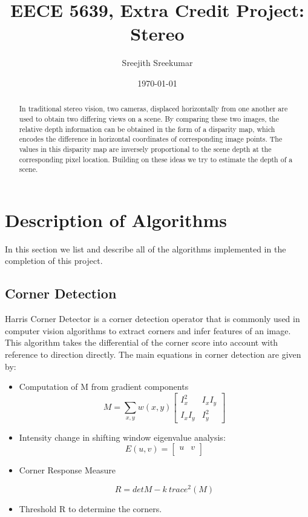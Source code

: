 \documentclass[letterpaper,11pt]{article}
\title{\textbf{EECE 5639, Extra Credit Project:
\\{\Large Stereo}}}
\author{Sreejith Sreekumar}
\date{\today}
\begin{document}
\maketitle

\begin{abstract}
  In traditional stereo vision, two cameras, displaced horizontally from one another are used to obtain two differing views on a scene. By comparing these two images, the relative depth information can be obtained in the form of a disparity map, which encodes the difference in horizontal coordinates of corresponding image points. The values in this disparity map are inversely proportional to the scene depth at the corresponding pixel location. Building on these ideas we try to estimate the depth of a scene.
 \end{abstract}


\section{Description of Algorithms}
In this section we list and describe all of the algorithms implemented in the completion of this
project.

\subsection{Corner Detection}
Harris Corner Detector is a corner detection operator that is commonly used in computer vision algorithms to extract corners and infer features of an image. This algorithm takes the differential of the corner score into account with reference to direction directly. The main equations in corner detection are given by:

\begin{itemize}
\item  Computation of M from gradient components
\[
  M = \sum\limits_{x,y} w(x,y)
    \begin{bmatrix}
      I_{x}^{2} & I_{x}I_{y} \\
      I_{x}I_{y} & I_{y} ^{2}
    \end{bmatrix}
\]
\item Intensity change in shifting window eigenvalue analysis:
\[
E(u, v) =
    \begin{bmatrix}
      u & v \\
    \end{bmatrix}
    \]
\item Corner Response Measure

\[
 R = det M - k\ trace^{2}(M)
\]

\item Threshold R to determine the corners.

\end{itemize}
\end{document}
